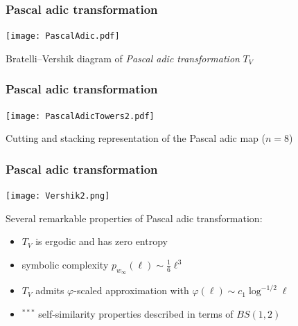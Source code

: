 \begin{frame}
  \frametitle{Pascal adic transformation}
  
  \begin{center}
    \texttt{[image: PascalAdic.pdf]}

    Bratelli--Vershik diagram of {\it Pascal adic transformation\/} $T_V$ 
  \end{center}
  
\end{frame}


\begin{frame}
  \frametitle{Pascal adic transformation}
  
  \begin{center}
    \texttt{[image: PascalAdicTowers2.pdf]}

    {\small Cutting and stacking representation of the Pascal adic map ($n = 8$)}  
  \end{center}
  
\end{frame}



\begin{frame}
  \frametitle{Pascal adic transformation}
  
  \begin{center}
    \texttt{[image: Vershik2.png]}
  \end{center}

  \medskip
  Several remarkable properties of Pascal adic transformation:
  \begin{itemize}
    \item $T_V$ is ergodic and has zero entropy
    \item symbolic complexity $p_{w_\infty}(\ell) \sim \frac16 \ell^3$
    \item $T_V$ admits $\varphi$-scaled approximation with $\varphi(\ell) \sim c_1 \log^{-1/2} \ell$ 
    \item ${}^{***}$ self-similarity properties described in terms of {\color{red} $BS(1,2)$}  
  \end{itemize}
  
  \bigskip
 
\end{frame}



